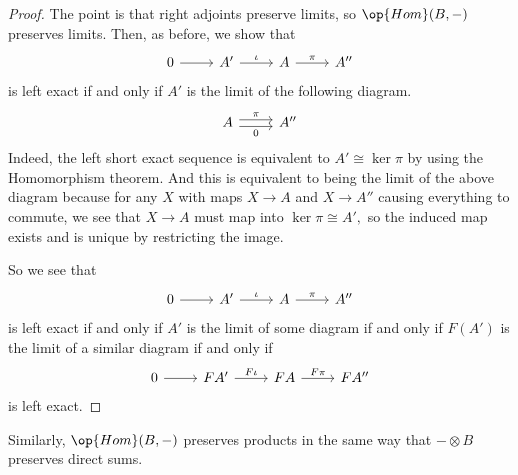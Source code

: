 \begin{proof}
	The point is that right adjoints preserve limits, so $\op{Hom}(B,-)$ preserves limits. Then, as before, we show that
	\[\begin{tikzcd}
		0 & {A'} & A & {A''}
		\arrow[from=1-1, to=1-2]
		\arrow["\pi", from=1-3, to=1-4]
		\arrow["\iota", from=1-2, to=1-3]
	\end{tikzcd}\]
	is left exact if and only if $A'$ is the limit of the following diagram.
	\[\begin{tikzcd}
		A & {A''}
		\arrow["\pi", shift left=1, from=1-1, to=1-2]
		\arrow["0"', shift right=1, from=1-1, to=1-2]
	\end{tikzcd}\]
	Indeed, the left short exact sequence is equivalent to $A'\cong\ker\pi$ by using the Homomorphism theorem. And this is equivalent to being the limit of the above diagram because for any $X$ with maps $X\to A$ and $X\to A''$ causing everything to commute, we see that $X\to A$ must map into $\ker\pi\cong A',$ so the induced map exists and is unique by restricting the image.

	So we see that
	\[\begin{tikzcd}
		0 & {A'} & A & {A''}
		\arrow[from=1-1, to=1-2]
		\arrow["\pi", from=1-3, to=1-4]
		\arrow["\iota", from=1-2, to=1-3]
	\end{tikzcd}\]
	is left exact if and only if $A'$ is the limit of some diagram if and only if $F(A')$ is the limit of a similar diagram if and only if
	\[\begin{tikzcd}
		0 & {FA'} & FA & {FA''}
		\arrow[from=1-1, to=1-2]
		\arrow["F\pi", from=1-3, to=1-4]
		\arrow["F\iota", from=1-2, to=1-3]
	\end{tikzcd}\]
	is left exact.
\end{proof}
Similarly, $\op{Hom}(B,-)$ preserves products in the same way that $-\otimes B$ preserves direct sums.

